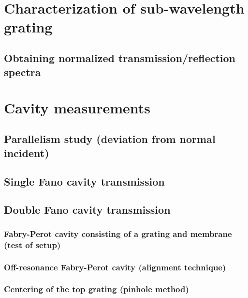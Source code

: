 \section{Characterization of sub-wavelength grating}

\subsection{Obtaining normalized transmission/reflection spectra}

\section{Cavity measurements}

\subsection{Parallelism study (deviation from normal incident)}

\subsection{Single Fano cavity transmission} 

\subsection{Double Fano cavity transmission}

\subsubsection{Fabry-Perot cavity consisting of a grating and membrane (test of setup)}

\subsubsection{Off-resonance Fabry-Perot cavity (alignment technique)}

\subsubsection{Centering of the top grating (pinhole method)}
